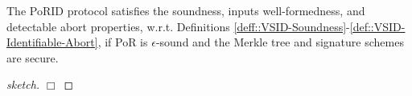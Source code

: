\begin{theorem}
The PoRID protocol satisfies the soundness, inputs well-formedness, and detectable abort properties, w.r.t. Definitions \ref{deff::VSID-Soundness}-\ref{def::VSID-Identifiable-Abort}, if PoR is $\epsilon$-sound and the Merkle tree and signature schemes are secure.
\end{theorem}


\begin{proof}[sketch]


 \hfill\(\Box\)\end{proof}
















